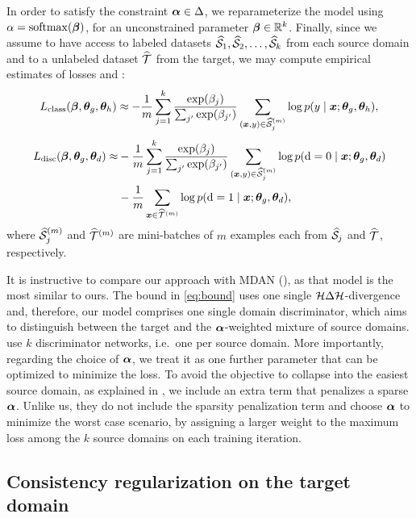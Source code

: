 In order to satisfy the constraint ${\bm{\alpha}} \in \Delta$, we reparameterize the model using $\alpha = \mathrm{softmax}({\bm{\beta}})$, for an unconstrained parameter ${\bm{\beta}} \in {\mathbb{R}}^k$. Finally, since we assume to have access to labeled datasets $\widehat{{\mathcal{S}}}_1,\widehat{{\mathcal{S}}}_2,\dots,\widehat{{\mathcal{S}}}_k$ from each source domain and to a unlabeled dataset $\widehat{{\mathcal{T}}}$ from the target, we may compute empirical estimates of losses  and :
\begin{equation}
\label{eq:emp_loss_class}
L_\text{class}({\bm{\beta}}, {\bm{\theta}}_g, {\bm{\theta}}_h) \approx -\frac{1}{m}\sum_{j=1}^k \frac{\exp({\beta}_j)}{\sum_{j'} \exp({\beta}_{j'})} \sum_{({\bm{x}},y) \in \widehat{{\mathcal{S}}}_j^{(m)}} \log p(y \mid {\bm{x}}; {\bm{\theta}}_g, {\bm{\theta}}_h),
\end{equation}
\begin{align}
\label{eq:emp_loss_disc}
L_\text{disc}({\bm{\beta}}, {\bm{\theta}}_g, {\bm{\theta}}_d) \approx& -\frac{1}{m}\sum_{j=1}^k \frac{\exp({\beta}_j)}{\sum_{j'} \exp({\beta}_{j'})} \sum_{({\bm{x}},y) \in \widehat{{\mathcal{S}}}_j^{(m)}} \log p({\textnormal{d}}=0 \mid {\bm{x}}; {\bm{\theta}}_g, {\bm{\theta}}_d) \\
&-\frac{1}{m}\sum_{{\bm{x}} \in \widehat{{\mathcal{T}}}^{(m)}} \log p({\textnormal{d}}=1 \mid {\bm{x}}; {\bm{\theta}}_g, {\bm{\theta}}_d), \nonumber
\end{align}
where $\widehat{{\mathcal{S}}}_j^{(m)}$ and $\widehat{{\mathcal{T}}}^{(m)}$ are mini-batches of $m$ examples each from $\widehat{{\mathcal{S}}}_j$ and $\widehat{{\mathcal{T}}}$, respectively.

It is instructive to compare our approach with MDAN (\citet{Zhao2018}), as that model is the most similar to ours. The bound in \eqref{eq:bound} uses one single ${\mathcal{H}} \Delta {\mathcal{H}}$-divergence and, therefore, our model comprises one single domain discriminator, which aims to distinguish between the target and the ${\bm{\alpha}}$-weighted mixture of source domains. \citet{Zhao2018} use $k$ discriminator networks, i.e.\ one per source domain. More importantly, regarding the choice of ${\bm{\alpha}}$, we treat it as one further parameter that can be optimized to minimize the loss. To avoid the objective to collapse into the easiest source domain, as explained in , we include an extra term that penalizes a sparse ${\bm{\alpha}}$. Unlike us, they do not include the sparsity penalization term and choose ${\bm{\alpha}}$ to minimize the worst case scenario, by assigning a larger weight to the maximum loss among the $k$ source domains on each training iteration. 

\subsection{Consistency regularization on the target domain}
\label{sec:modafm_consistency}

